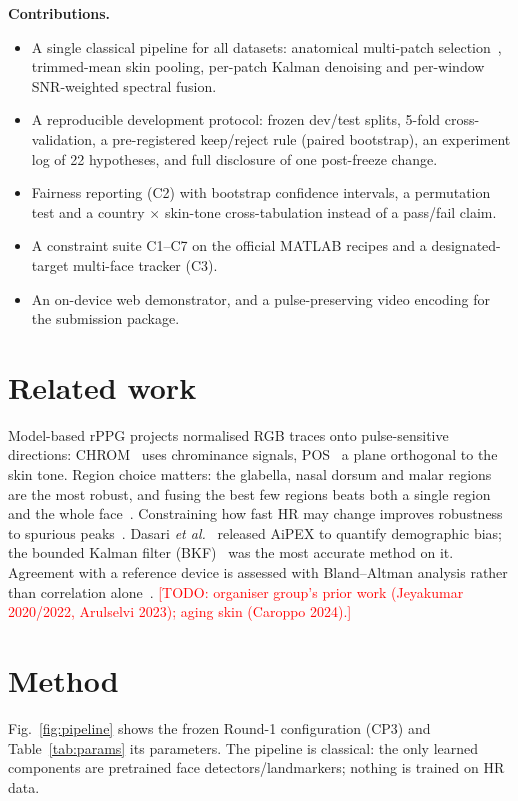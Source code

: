 \documentclass[conference]{IEEEtran}
\newcommand{\todo}[1]{\textcolor{red}{[TODO: #1]}}
\begin{document}
\textbf{Contributions.}
\begin{itemize}
  \item A single classical pipeline for all datasets: anatomical multi-patch selection~\cite{li2026roi}, trimmed-mean
        skin pooling, per-patch Kalman denoising and per-window SNR-weighted spectral fusion.
  \item A reproducible development protocol: frozen dev/test splits, 5-fold cross-validation, a pre-registered keep/reject
        rule (paired bootstrap), an experiment log of 22 hypotheses, and full disclosure of one post-freeze change.
  \item Fairness reporting (C2) with bootstrap confidence intervals, a permutation test and a country $\times$ skin-tone
        cross-tabulation instead of a pass/fail claim.
  \item A constraint suite C1--C7 on the official MATLAB recipes and a designated-target multi-face tracker (C3).
  \item An on-device web demonstrator, and a pulse-preserving video encoding for the submission package.
\end{itemize}

\section{Related work}
Model-based rPPG projects normalised RGB traces onto pulse-sensitive directions: CHROM~\cite{dehaan2013chrom} uses
chrominance signals, POS~\cite{wang2017pos} a plane orthogonal to the skin tone. Region choice matters: the glabella,
nasal dorsum and malar regions are the most robust, and fusing the best few regions beats both a single region and the
whole face~\cite{li2026roi,bondarenko2025roi}. Constraining how fast HR may change improves robustness to spurious
peaks~\cite{tian2026correction}. Dasari \emph{et al.}~\cite{dasari2021bias} released AiPEX to quantify demographic bias;
the bounded Kalman filter (BKF)~\cite{prakash2018bkf} was the most accurate method on it. Agreement with a reference
device is assessed with Bland--Altman analysis rather than correlation alone~\cite{altman1983measurement,bland1986statistical}.
\todo{organiser group's prior work (Jeyakumar 2020/2022, Arulselvi 2023); aging skin (Caroppo 2024).}

\section{Method}
Fig.~\ref{fig:pipeline} shows the frozen Round-1 configuration (CP3) and Table~\ref{tab:params} its parameters. The
pipeline is classical: the only learned components are pretrained face detectors/landmarkers; nothing is trained on HR data.
\end{document}
